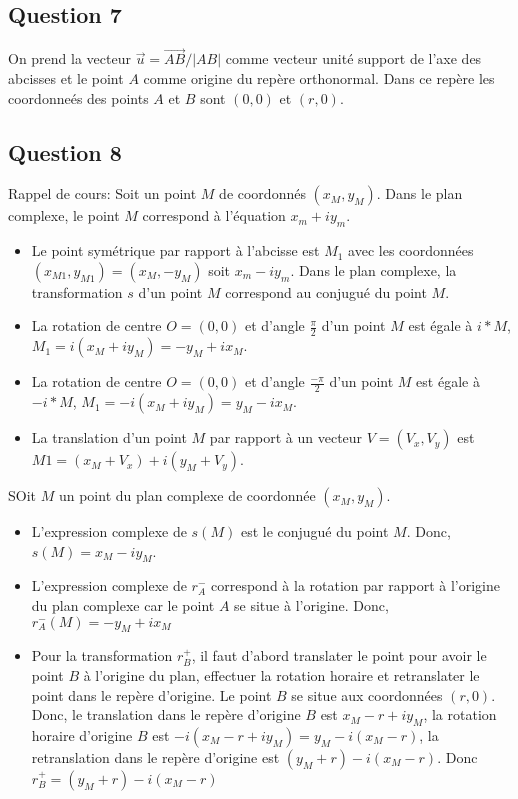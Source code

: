 \documentclass[]{book}
\theoremstyle{definition}
\begin{document}
\subsection*{Question 7}
On prend la vecteur $\overrightarrow{u} = \overrightarrow{AB}/|AB|$ comme vecteur unit\'e support de l'axe des abcisses et le point $A$ comme origine du rep\`ere orthonormal. Dans ce rep\`ere les coordonne\'es des points $A$ et $B$ sont $(0,0)$ et $(r,0)$. 


\subsection*{Question 8}

Rappel de cours: Soit un point $M$ de coordonn\'es $(x_M,y_M)$. Dans le plan complexe, le point $M$ correspond \`a l'\'equation $x_m + iy_m$. 
\begin{itemize}
\item Le point sym\'etrique par rapport \`a l'abcisse est $M_1$ avec les coordonn\'ees $(x_{M1},y_{M1}) =(x_M,-y_M)$ soit $x_m - iy_m$. Dans le plan complexe, la transformation $s$ d'un point $M$ correspond au conjugu\'e du point $M$.
\item La rotation de centre $O = (0,0)$ et d'angle $\frac{\pi}{2}$ d'un point $M$ est \'egale \`a $i*M$, $M_1 = i (x_M + iy_M) = -y_M + i x_M$.  
\item La rotation de centre $O = (0,0)$ et d'angle $\frac{-\pi}{2}$ d'un point $M$ est \'egale \`a $-i*M$, $M_1 = -i (x_M + i y_M) = y_M - ix_M$.  
\item La translation d'un point $M$ par rapport \`a un vecteur $V=(V_x, V_y)$ est $M1 = (x_M+V_x) + i(y_M+V_y)$.
\end{itemize}


SOit $M$ un point du plan complexe de coordonn\'ee $(x_M, y_M)$.\\

\begin{itemize}
\item L'expression complexe de $s(M)$ est le conjugu\'e du point $M$. Donc, $s(M) = x_M - iy_M$.
\item L'expression complexe de $r^{-}_A$ correspond \`a la rotation par rapport \`a l'origine du plan complexe car le point $A$ se situe \`a l'origine. Donc, $r^{-}_A(M) = - y_M + ix_M $
\item Pour la transformation $r^{+}_B$, il faut d'abord translater le point pour avoir le point $B$ \`a l'origine du plan, effectuer la rotation horaire et retranslater le point dans le rep\`ere d'origine. Le point $B$ se situe aux coordonn\'ees $(r,0)$. Donc, le translation dans le rep\`ere d'origine $B$ est $x_M-r + iy_M$, la rotation horaire d'origine $B$ est $-i(x_M-r + iy_M)= y_M -i(x_M-r)$, la retranslation dans le rep\`ere d'origine est $(y_M+r) -i(x_M-r)$. Donc $r^{+}_B = (y_M+r) -i(x_M-r)$ 
\end{itemize}
\end{document}
